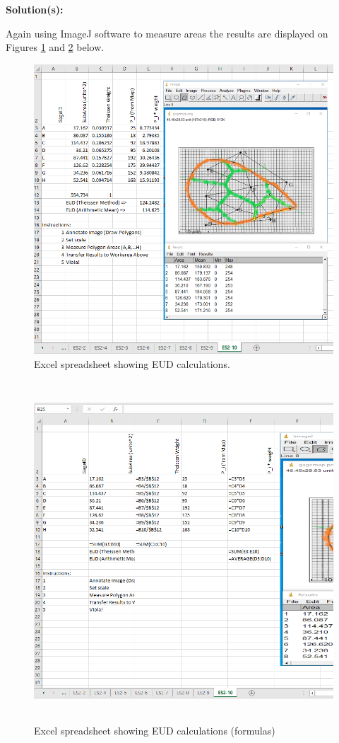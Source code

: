 \documentclass[12pt]{article}
\begin{document}
\begin{enumerate}
\textbf{Solution(s):}

Again using ImageJ software to measure areas the results are displayed on Figures \ref{fig:es2-10xls} and \ref{fig:es2-10func} below.

\begin{figure}[h!] %
   \centering
   \includegraphics[width=5in]{es2-10xls.png} 
   \caption{Excel spreadsheet showing EUD calculations.}
   \label{fig:es2-10xls}
\end{figure}
\clearpage

\begin{figure}[h!] %
   \centering
   \includegraphics[height=5in]{es2-10func.png} 
   \caption{Excel spreadsheet showing EUD calculations (formulas)}
   \label{fig:es2-10func}
\end{figure}
\clearpage


\end{enumerate}
\end{document}
